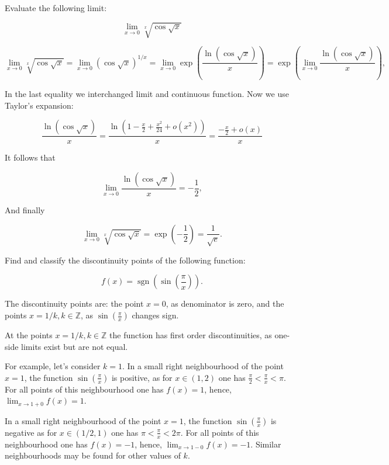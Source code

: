 \documentclass[addpoints]{exam} %
\DeclareMathOperator{\sgn}{sgn}
\begin{document}
\begin{questions}

\question[10] Evaluate the following limit:

\[
\lim_{x \to 0} \sqrt[x]{\cos \sqrt{x}}
\]

\begin{solution}

\[
\lim_{x \rightarrow 0} \sqrt[x]{\cos \sqrt{x}} = \lim_{x \rightarrow 0} \left({\cos \sqrt{x}}\right) ^{1/x} =  \lim_{x \rightarrow 0} \exp
\left( \frac{\ln (\cos \sqrt{x})}{x} \right) = \exp \left( \lim_{x \rightarrow 0}
\frac{\ln (\cos \sqrt{x})}{x} \right),
\]

In the last equality we interchanged limit and continuous function. Now we use Taylor's expansion:

\[
\frac{\ln (\cos \sqrt{x})}{x} = \frac{\ln (1-
\frac{x}{2}+\frac{x^2}{24}+o(x^2))}{x} = \frac{-\frac{x}{2}+o(x)}{x}
\]

\noindent It follows that

\[
\lim_{x \rightarrow 0} \frac{\ln (\cos \sqrt{x})}{x} = -\frac{1}{2},
\]

\noindent And finally

\[
\lim_{x \rightarrow 0} \sqrt[x]{\cos \sqrt{x}} = \exp \left( -\frac{1}{2}\right) = \frac{1}{\sqrt{e}}.
\]
\end{solution}

\question[10] Find and classify the discontinuity points of the following function:

\[
f(x) = {\sgn} \left(\sin \left( \frac{\pi}{x}\right)\right).
\]

\begin{solution}
The discontinuity points are: the point $x=0$, as denominator is zero, and the points $x=1/k, k \in \mathbb{Z}$, as $\sin \left( \frac{\pi}{x}\right)$ changes sign.


At the points $x=1/k, k \in \mathbb{Z}$ the function has first order discontinuities, as one-side limits exist but are not equal.

For example, let's consider $k=1$. In a small right neighbourhood of the point $x=1$, the function $\sin \left( \frac{\pi}{x} \right)$ is positive, as for $x \in (1,2)$ one has $\frac{\pi}{2} < \frac{\pi}{x} < \pi$. For all points of this neighbourhood one has $f(x) = 1$, hence, $\lim_{x \rightarrow 1+0} f(x) = 1$.

In a small right neighbourhood of the point $x=1$, the function $\sin \left( \frac{\pi}{x} \right)$ is negative as for $x \in (1/2,1)$ one has $\pi < \frac{\pi}{x} < 2 \pi$. For all points of this neighbourhood one has $f(x) = -1$, hence, $\lim_{x \rightarrow 1-0} f(x) = -1$. Similar neighbourhoods may be found for other values of $k$.




\end{solution}
\end{questions}
\end{document}
